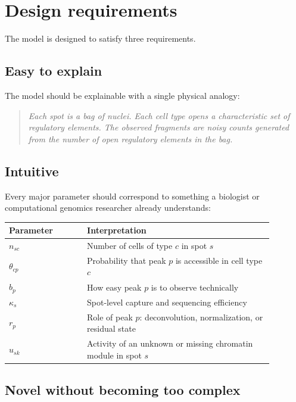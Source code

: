 \documentclass[11pt]{article}
\begin{document}
\section{Design requirements}

The model is designed to satisfy three requirements.

\subsection{Easy to explain}

The model should be explainable with a single physical analogy:

\begin{quote}
\textit{Each spot is a bag of nuclei. Each cell type opens a characteristic set of regulatory elements. The observed fragments are noisy counts generated from the number of open regulatory elements in the bag.}
\end{quote}

\subsection{Intuitive}

Every major parameter should correspond to something a biologist or computational genomics researcher already understands:

\begin{center}
\begin{tabular}{p{0.26\linewidth}p{0.62\linewidth}}
\toprule
Parameter & Interpretation \\
\midrule
$n_{sc}$ & Number of cells of type $c$ in spot $s$ \\
$\theta_{cp}$ & Probability that peak $p$ is accessible in cell type $c$ \\
$b_p$ & How easy peak $p$ is to observe technically \\
$\kappa_s$ & Spot-level capture and sequencing efficiency \\
$r_p$ & Role of peak $p$: deconvolution, normalization, or residual state \\
$u_{sk}$ & Activity of an unknown or missing chromatin module in spot $s$ \\
\bottomrule
\end{tabular}
\end{center}

\subsection{Novel without becoming too complex}
\end{document}
